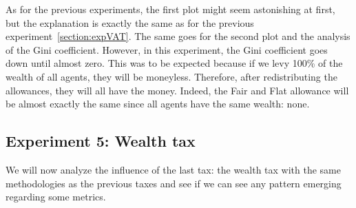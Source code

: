 {{        As for the previous experiments, the first plot might seem astonishing at first, but the explanation is exactly the same as for the previous experiment~\ref{section:expVAT}. The same goes for the second plot and the analysis of the Gini coefficient. However, in this experiment, the Gini coefficient goes down until almost zero. This was to be expected because if we levy 100\% of the wealth of all agents, they will be moneyless. Therefore, after redistributing the allowances, they will all have the money. Indeed, the Fair and Flat allowance will be almost exactly the same since all agents have the same wealth: none.

    \subsection{Experiment 5: Wealth tax}
    We will now analyze the influence of the last tax: the wealth tax with the same methodologies as the previous taxes and see if we can see any pattern emerging regarding some metrics. 

}}
